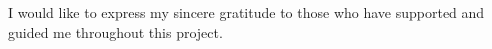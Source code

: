 







{}

I would like to express my sincere gratitude to those who have supported and guided me throughout this project.
\medskip

